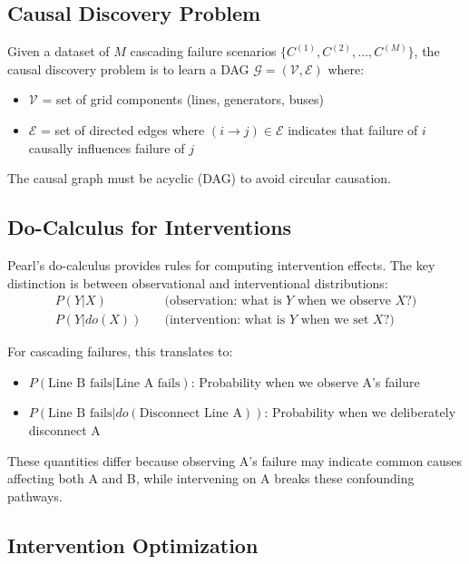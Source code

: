 \documentclass[journal,12pt,onecolumn]{IEEEtran}
\begin{document}
\subsection{Causal Discovery Problem}

Given a dataset of $M$ cascading failure scenarios $\{C^{(1)}, C^{(2)}, \ldots, C^{(M)}\}$, the causal discovery problem is to learn a DAG $\mathcal{G} = (\mathcal{V}, \mathcal{E})$ where:
\begin{itemize}
    \item $\mathcal{V}$ = set of grid components (lines, generators, buses)
    \item $\mathcal{E}$ = set of directed edges where $(i \rightarrow j) \in \mathcal{E}$ indicates that failure of $i$ causally influences failure of $j$
\end{itemize}

The causal graph must be acyclic (DAG) to avoid circular causation.

\subsection{Do-Calculus for Interventions}

Pearl's do-calculus \cite{ref3} provides rules for computing intervention effects. The key distinction is between observational and interventional distributions:
\begin{align}
P(Y | X) &\quad \text{(observation: what is $Y$ when we observe $X$?)} \\
P(Y | do(X)) &\quad \text{(intervention: what is $Y$ when we set $X$?)}
\end{align}

For cascading failures, this translates to:
\begin{itemize}
    \item $P(\text{Line B fails} | \text{Line A fails})$: Probability when we observe A's failure
    \item $P(\text{Line B fails} | do(\text{Disconnect Line A}))$: Probability when we deliberately disconnect A
\end{itemize}

These quantities differ because observing A's failure may indicate common causes affecting both A and B, while intervening on A breaks these confounding pathways.

\subsection{Intervention Optimization}
\end{document}
